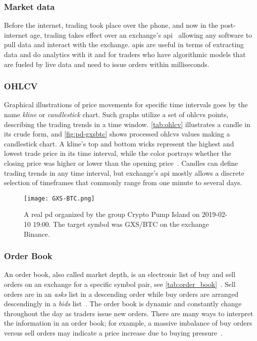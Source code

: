 \subsubsection{Market data}
Before the internet, trading took place over the phone, and now in the post-internet age, trading takes effect over an exchange's \ac{api}~\cite{exchange_api} allowing any software to pull data and interact with the exchange. \Acp{api} are useful in terms of extracting data and do analytics with it and for traders who have algorithmic models that are fueled by live data and need to issue orders within milliseconds.

\subsubsection{OHLCV}
Graphical illustrations of price movements for specific time intervals goes by the name \emph{kline} or \emph{candlestick} chart. Such graphs utilize a set of \acp{ohlcv} points, describing the trading trends in a time window. \autoref{tab:ohlcv} illustrates a candle in its crude form, and \autoref{fig:pd-gxsbtc} shows processed \acp{ohlcv} values making a candlestick chart. A kline's top and bottom wicks represent the highest and lowest trade price in its time interval, while the color portrays whether the closing price was higher or lower than the opening price~\cite{P&D_to_the_moon}. Candles can define trading trends in any time interval, but exchange's \ac{api} mostly allows a discrete selection of timeframes that commonly range from one minute to several days.



\begin{figure}[ht]
    \texttt{[image: GXS-BTC.png]}
    \centering
    \caption[\Acl{pd} observation]{A real \ac{pd} organized by the group Crypto Pump Island on 2019-02-10 19:00. The target symbol was GXS/BTC on the exchange Binance.}
    \label{fig:pd-gxsbtc}
\end{figure}

\subsubsection{Order Book}
An order book, also called market depth, is an electronic list of buy and sell orders on an exchange for a specific symbol pair, see \autoref{tab:order_book}~\cite{investopedia_depth}. Sell orders are in an \emph{asks} list in a descending order while buy orders are arranged descendingly in a \emph{bids} list~\cite{invest_order_book, coincodex_order_book}. The order book is dynamic and constantly change throughout the day as traders issue new orders. There are many ways to interpret the information in an order book; for example, a massive imbalance of buy orders versus sell orders may indicate a price increase due to buying pressure~\cite{invest_order_book}.

